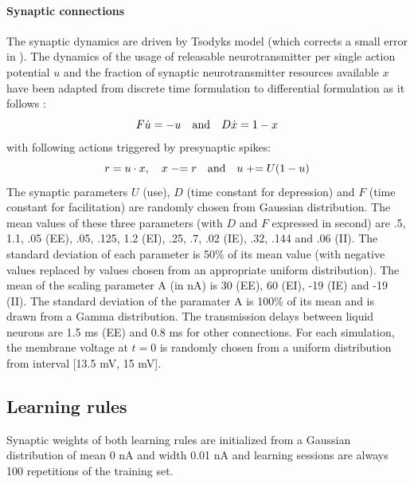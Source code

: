\documentclass[11pt, a4paper]{article} %
\begin{document}
\paragraph{Synaptic connections} The synaptic dynamics are driven by Tsodyks model \cite{maass2002synapses} (which corrects a small error in \cite{markram1998differential}). The dynamics of the usage of releasable neurotransmitter per single action potential $u$ and the fraction of synaptic neurotransmitter resources available $x$ have been adapted from discrete time formulation to differential formulation as it follows : \begin{equation}
F \dot{u} = -u \quad \textnormal{and} \quad D \dot{x} = 1-x
\end{equation}
with following actions triggered by presynaptic spikes: \begin{equation}
r = u \cdot x, \quad x \mathrel{-}= r \quad \textnormal{and} \quad u \mathrel{+}= U(1-u)
\end{equation}
The synaptic parameters $U$ (use), $D$ (time constant for depression) and $F$ (time constant for facilitation) are randomly chosen from Gaussian distribution. The mean values of these three parameters (with $D$ and $F$ expressed in second) are .5, 1.1, .05 (EE), .05, .125, 1.2 (EI), .25, .7, .02 (IE), .32, .144 and .06 (II). The standard deviation of each parameter is 50\% of its mean value (with negative values replaced by values chosen from an appropriate uniform distribution). The mean of the scaling parameter A (in nA) is 30 (EE), 60 (EI), -19 (IE) and -19 (II). The standard deviation of the paramater A is 100\% of its mean and is drawn from a Gamma distribution. The transmission delays between liquid neurons are 1.5 ms (EE) and 0.8 ms for other connections. For each simulation, the membrane voltage at $t=0$ is randomly chosen from a uniform distribution from interval [13.5 mV, 15 mV].

\subsection{Learning rules}
Synaptic weights of both learning rules are initialized from a Gaussian distribution of mean 0 nA and width 0.01 nA and learning sessions are always 100 repetitions of the training set.
\end{document}
